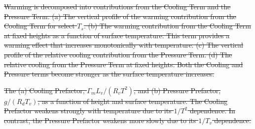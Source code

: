 \documentclass[]{ametsocV6.1} %
\providecommand{\DIFdel}[1]{{\protect\color{red}\sout{#1}}} %
\providecommand{\DIFdelbegin}{} %
\providecommand{\DIFdelFL}[1]{\DIFdel{#1}} %
\providecommand{\DIFaddbeginFL}{} %
\providecommand{\DIFaddendFL}{} %
\providecommand{\DIFdelendFL}{} %
\begin{document}
\begin{figure}[htbp]
\DIFdelendFL \DIFaddbeginFL \label{fig:fig-5}
\DIFaddendFL \end{figure}

\DIFdelbegin %
{%
\DIFdelFL{Warming is decomposed into contributions from the Cooling Term and the Pressure Term. (a) The vertical profile of the warming contribution from the Cooling Term for select $T_s$. (b) The warming contribution from the Cooling Term at fixed heights as a function of surface temperature. This term provides a warming effect that increases monotonically with temperature. (c) The vertical profile of the relative cooling contribution from the Pressure Term. (d) The relative cooling from the Pressure Term at fixed heights. Both the Cooling and Pressure terms become stronger as the surface temperature increases.}}%

{%
\DIFdelFL{The (a) Cooling Prefactor, $\Gamma_m L_v / (R_v T^2)$, and (b) Pressure Prefactor, $g/(R_d T_v)$, as a function of height and surface temperature. The Cooling Prefactor weakens strongly with temperature due to its $1/T^2$ dependence. In contrast, the Pressure Prefactor weakens more slowly due to its $1/T_v$ dependence.}}%
\end{document}
